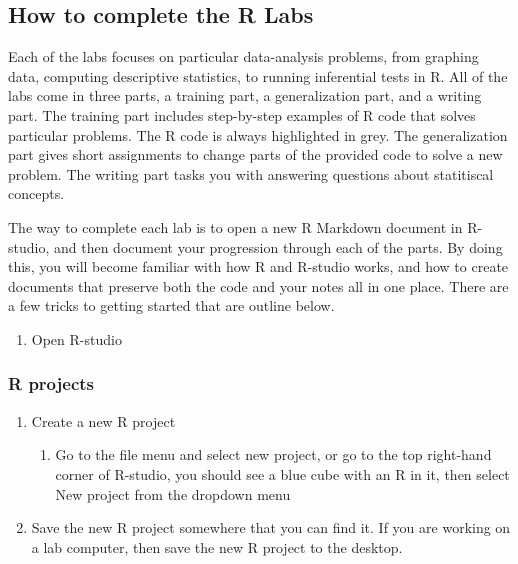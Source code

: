\documentclass[
]{book}
\providecommand{\tightlist}{%
  \setlength{\itemsep}{0pt}\setlength{\parskip}{0pt}}
\begin{document}
\hypertarget{how-to-complete-the-r-labs}{%
\subsection{How to complete the R Labs}\label{how-to-complete-the-r-labs}}

Each of the labs focuses on particular data-analysis problems, from graphing data, computing descriptive statistics, to running inferential tests in R. All of the labs come in three parts, a training part, a generalization part, and a writing part. The training part includes step-by-step examples of R code that solves particular problems. The R code is always highlighted in grey. The generalization part gives short assignments to change parts of the provided code to solve a new problem. The writing part tasks you with answering questions about statitiscal concepts.

The way to complete each lab is to open a new R Markdown document in R-studio, and then document your progression through each of the parts. By doing this, you will become familiar with how R and R-studio works, and how to create documents that preserve both the code and your notes all in one place. There are a few tricks to getting started that are outline below.

\begin{enumerate}
\def\labelenumi{\arabic{enumi}.}
\tightlist
\item
  Open R-studio
\end{enumerate}

\hypertarget{r-projects}{%
\subsubsection{R projects}\label{r-projects}}

\begin{enumerate}
\def\labelenumi{\arabic{enumi}.}
\setcounter{enumi}{1}
\tightlist
\item
  Create a new R project

  \begin{enumerate}
  \def\labelenumii{\alph{enumii}.}
  \tightlist
  \item
    Go to the file menu and select new project, or go to the top right-hand corner of R-studio, you should see a blue cube with an R in it, then select New project from the dropdown menu
  \end{enumerate}
\item
  Save the new R project somewhere that you can find it. If you are working on a lab computer, then save the new R project to the desktop.
\end{enumerate}
\end{document}
